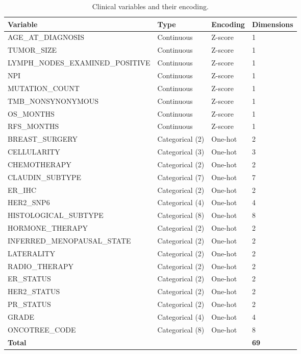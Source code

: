 \documentclass[11pt,a4paper]{article}
\begin{document}
\begin{table}[H]
\centering
\caption{Clinical variables and their encoding.}
\label{supp:tab:clinical}
\begin{tabular}{llll}
\toprule
\textbf{Variable} & \textbf{Type} & \textbf{Encoding} & \textbf{Dimensions} \\
\midrule
AGE\_AT\_DIAGNOSIS & Continuous & Z-score & 1 \\
TUMOR\_SIZE & Continuous & Z-score & 1 \\
LYMPH\_NODES\_EXAMINED\_POSITIVE & Continuous & Z-score & 1 \\
NPI & Continuous & Z-score & 1 \\
MUTATION\_COUNT & Continuous & Z-score & 1 \\
TMB\_NONSYNONYMOUS & Continuous & Z-score & 1 \\
OS\_MONTHS & Continuous & Z-score & 1 \\
RFS\_MONTHS & Continuous & Z-score & 1 \\
\midrule
BREAST\_SURGERY & Categorical (2) & One-hot & 2 \\
CELLULARITY & Categorical (3) & One-hot & 3 \\
CHEMOTHERAPY & Categorical (2) & One-hot & 2 \\
CLAUDIN\_SUBTYPE & Categorical (7) & One-hot & 7 \\
ER\_IHC & Categorical (2) & One-hot & 2 \\
HER2\_SNP6 & Categorical (4) & One-hot & 4 \\
HISTOLOGICAL\_SUBTYPE & Categorical (8) & One-hot & 8 \\
HORMONE\_THERAPY & Categorical (2) & One-hot & 2 \\
INFERRED\_MENOPAUSAL\_STATE & Categorical (2) & One-hot & 2 \\
LATERALITY & Categorical (2) & One-hot & 2 \\
RADIO\_THERAPY & Categorical (2) & One-hot & 2 \\
ER\_STATUS & Categorical (2) & One-hot & 2 \\
HER2\_STATUS & Categorical (2) & One-hot & 2 \\
PR\_STATUS & Categorical (2) & One-hot & 2 \\
GRADE & Categorical (4) & One-hot & 4 \\
ONCOTREE\_CODE & Categorical (8) & One-hot & 8 \\
\midrule
\textbf{Total} & & & \textbf{69} \\
\bottomrule
\end{tabular}
\end{table}
\end{document}
